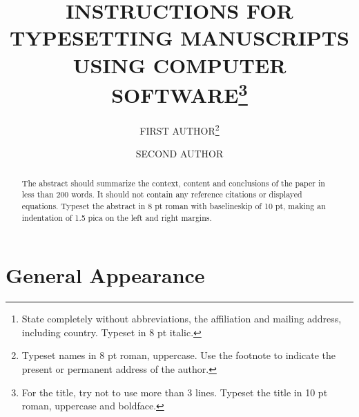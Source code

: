 \documentclass{ws-jmmb}
\begin{document}

%
\catchline{}{}{}{}{}
%

\title{INSTRUCTIONS FOR TYPESETTING MANUSCRIPTS\\
USING COMPUTER SOFTWARE\footnote{For the title, try not to use more
than 3 lines.  Typeset the title in 10 pt roman, uppercase and
boldface.}  }

\author{FIRST AUTHOR\footnote{Typeset names in 
8 pt roman, uppercase. Use the footnote to indicate the
present or permanent address of the author.}}

\address{University Department, University Name, Address\\
City, State ZIP/Zone,Country\,\footnote{State completely without
abbreviations, the affiliation and mailing address, including
country. Typeset in 8 pt italic.}\\
 }

\author{SECOND AUTHOR}

\address{Group, Laboratory, Address\\
City, State ZIP/Zone, Country\\
author\_id@domain\_name
}

\maketitle

\begin{history}
\end{history}

\begin{abstract}
The abstract should summarize the context, content and conclusions of
the paper in less than 200 words. It should not contain any reference
citations or displayed equations. Typeset the abstract in 8 pt roman
with baselineskip of 10 pt, making an indentation of 1.5 pica on the
left and right margins.
\end{abstract}



\section{General Appearance}	%
\end{document}
